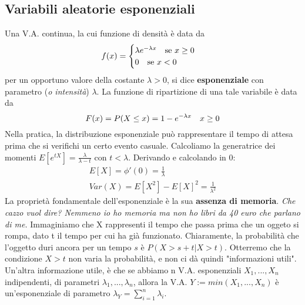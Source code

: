 \documentclass[11pt]{article}
\begin{document}
\subsection{Variabili aleatorie esponenziali}
Una V.A. continua, la cui funzione di densità è data da 
\begin{displaymath}
    f(x)=\begin{cases}
        \lambda e^{-\lambda x} \hspace{10px}\mbox{se }x\ge 0\\ 
        0\hspace{10px}\mbox{se }x<0
    \end{cases}
\end{displaymath}
per un opportuno valore della costante $\lambda>0$, si dice \textbf{esponenziale} con parametro (\textit{o intensità}) $\lambda$.
La funzione di ripartizione di una tale variabile è data da 
\begin{displaymath}
    F(x) = P(X\le x) = 1-e^{-\lambda x}\hspace{10px} x\ge 0
\end{displaymath}
Nella pratica, la distribuzione esponenziale può rappresentare il tempo di attesa prima che si verifichi un certo evento casuale. Calcoliamo la generatrice dei momenti $E[e^{tX}] = \frac{\lambda}{\lambda-t}$ con $t<\lambda$. Derivando e calcolando in 0:
\begin{gather*}
    E[X]=\phi'(0)=\frac{1}{\lambda}\\ 
    Var(X) = E[X^2] - E[X]^2 = \frac{1}{\lambda^2}
\end{gather*}
La proprietà fondamentale dell'esponenziale è la sua \textbf{assenza di memoria}. \textit{Che cazzo vuol dire? Nemmeno io ho memoria ma non ho libri da 40 euro che parlano di me.} Immaginiamo che X rappresenti il tempo che passa prima che un oggeto si rompa, dato t il tempo per cui ha già funzionato. Chiaramente, la probabilità che l'oggetto duri ancora per un tempo $s$ è $P(X>s+t | X>t)$. Otterremo che la condizione $X>t$ non varia la probabilità, e non ci dà quindi "informazioni utili".
Un'altra informazione utile, è che se abbiamo n V.A. esponenziali $X_1,...,X_n$ indipendenti, di parametri $\lambda_1,...,\lambda_n$, allora la V.A. $Y:=min(X_1,...,X_n)$ è un'esponenziale di parametro $\lambda_Y=\sum_{i=1}^n \lambda_i$.
\end{document}
